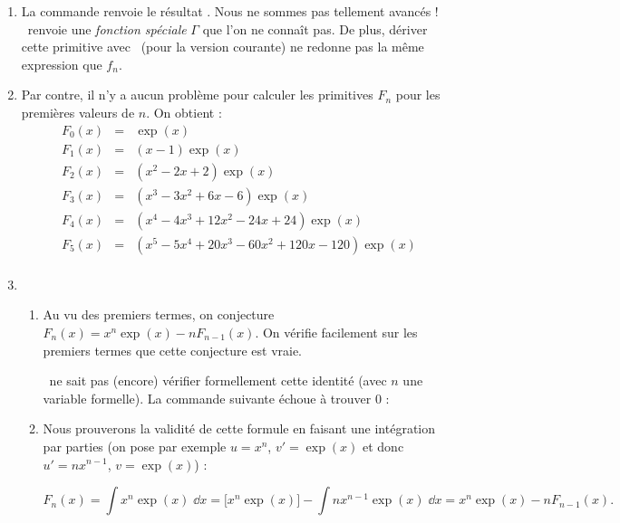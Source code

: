 \documentclass[class=report,crop=false]{standalone}
\begin{document}
\begin{enumerate}
  \item La commande 
  renvoie le résultat . 
  Nous ne sommes pas tellement avancés ! \Sage\ renvoie une \emph{fonction spéciale} $\Gamma$ 
  que l'on ne connaît pas.  
  De plus, %
  dériver cette primitive avec \Sage\ (pour la version courante) ne 
  redonne pas la même expression que $f_n$.
  
  \item Par contre, il n'y a aucun problème pour calculer les primitives $F_n$ 
  pour les premières valeurs de $n$. On obtient :
  $$\begin{array}{rcl}
    F_0(x) &=& \exp(x) \\
    F_1(x) &=& (x - 1)\exp(x) \\
    F_2(x) &=& (x^2 - 2x + 2)\exp(x) \\
    F_3(x) &=& (x^3 - 3x^2 + 6x - 6)\exp(x) \\
    F_4(x) &=& (x^4 - 4x^3 + 12x^2 - 24x + 24)\exp(x) \\
    F_5(x) &=& (x^5 - 5x^4 + 20x^3 - 60x^2 + 120x - 120)\exp(x) \\
  \end{array}$$  
   
    
  \item
  \begin{enumerate}
    \item Au vu des premiers termes, on conjecture $F_n(x) = x^n \exp(x) - nF_{n-1}(x)$.
    On vérifie facilement sur les premiers termes que cette conjecture est vraie.
    
     \Sage\ ne sait pas (encore) vérifier formellement cette identité 
     (avec $n$ une variable formelle). La commande suivante échoue à trouver $0$  : \\
    \centerline{}
    
    \item Nous prouverons la validité de cette formule en faisant 
    une intégration par parties
    (on pose par exemple $u=x^n$, $v'=\exp(x)$ et donc $u'=nx^{n-1}$, $v = \exp(x)$) :
    
    $$F_n(x) 
    = \int x^n \exp(x)\; \dd x 
    = \big[x^n\exp(x)\big] - \int nx^{n-1}\exp(x)\; \dd x
    = x^n\exp(x) - n F_{n-1}(x).$$
    

\end{enumerate}
\end{enumerate}
\end{document}
